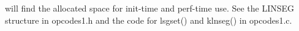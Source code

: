  


  will find the allocated space for init-time and perf-time use. See the LINSEG structure in opcodes1.h and the code for lsgset() and klnseg() in opcodes1.c. 


\begin{comment}
\begin{tabular}{lcr}
Previous &Home &Next \\
Adding your own Cmodules to Csound &Up &File Sharing

\end{tabular}



\end{comment}
